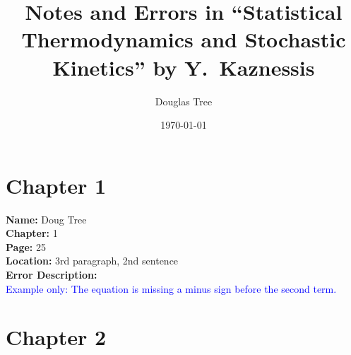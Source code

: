 \documentclass[a4paper,12pt]{article}
\title{Notes and Errors in ``Statistical Thermodynamics and Stochastic Kinetics'' by Y.~Kaznessis}
\author{Douglas Tree}
\date{\today}
\newcommand{\errornote}[5]{
    \noindent
    \textbf{Name:} #1 \\
    \textbf{Chapter:} #2 \\
    \textbf{Page:} #3 \\
    \textbf{Location:} #4 \\
    \textbf{Error Description:} \\
    \textcolor{blue}{#5} \vspace{0.5em} \\
}
\begin{document}
\maketitle

\tableofcontents

\newpage

\section{Chapter 1}


\errornote{Doug Tree}{1}{25}{3rd paragraph, 2nd sentence}{
Example only: The equation is missing a minus sign before the second term.
}


\newpage
\section{Chapter 2}


\end{document}
